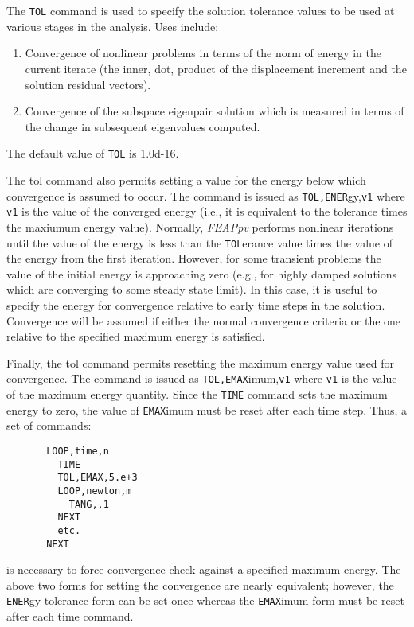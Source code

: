  \\{\smallskip}
 \\{\smallskip}
\headb

The {\tt TOL} command is used to specify the solution tolerance
values to be used at various stages in the analysis.  Uses include:
\begin{enumerate}
\item{
Convergence of nonlinear problems in terms of the norm
of  energy in the current iterate (the inner, dot, product
of the displacement  increment  and  the  solution
residual vectors).}
\item{
Convergence of the subspace eigenpair solution which is
measured  in  terms  of the change in subsequent eigenvalues computed.}
\end{enumerate}

The default value of {\tt TOL} is 1.0d-16.

The tol command also permits setting a value for the energy
below which convergence is assumed to occur.  The command is issued as
{\tt TOL,ENER}gy,{\tt v1} where {\tt v1} is the value of the converged
energy (i.e., it is equivalent to the tolerance times the maxiumum energy
value).  Normally, {\sl FEAPpv} performs nonlinear iterations until the
value of the energy is less than the {\tt TOL}erance value times the
value of the energy from the first iteration.  However, for some 
transient problems the value of the initial energy is approaching
zero (e.g., for highly damped solutions which are converging to some
steady state limit).  In this case, it is useful to specify the energy
for convergence relative to early time steps in the solution.  
Convergence will be assumed if either the normal convergence criteria
or the one relative to the specified maximum energy is satisfied.

Finally, the tol command permits resetting the maximum energy value used
for convergence.  The command is issued as
{\tt TOL,EMAX}imum,{\tt v1} where {\tt v1} is the value of the maximum
energy quantity. Since the {\tt TIME} command sets the maximum energy to
zero, the value of {\tt EMAX}imum must be reset after each time step. Thus,
a set of commands:
\begin{verbatim}
       LOOP,time,n
         TIME
         TOL,EMAX,5.e+3
         LOOP,newton,m
           TANG,,1
         NEXT
         etc.
       NEXT
\end{verbatim}
is necessary to force convergence check against a specified maximum energy.
The above two forms for setting the convergence are nearly equivalent; however,
the {\tt ENER}gy tolerance form can be set once whereas the {\tt EMAX}imum
form must be reset after each time command.
\vfill\eject
